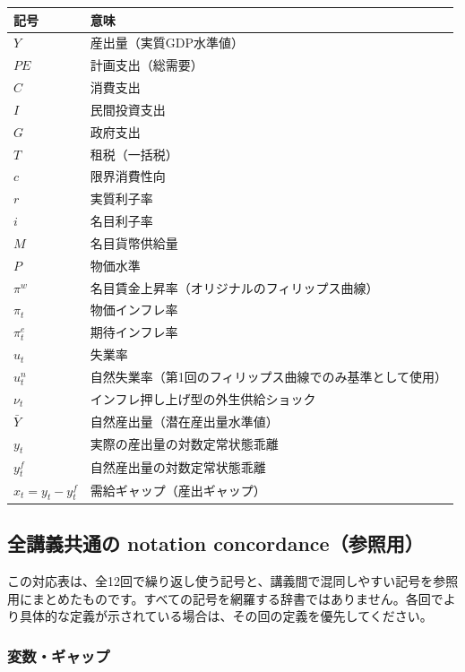 \documentclass[
  japanese,
  lualatex,
  ja=standard,
  12pt,
  a4paper]{ltjsarticle}
\newcounter{none} %
\begin{document}
{\def\LTcaptype{none} %
\begin{longtable}[]{@{}ll@{}}
\toprule\noalign{}
記号 & 意味 \\
\midrule\noalign{}
\endhead
\bottomrule\noalign{}
\endlastfoot
\(Y\) & 産出量（実質GDP水準値） \\
\(PE\) & 計画支出（総需要） \\
\(C\) & 消費支出 \\
\(I\) & 民間投資支出 \\
\(G\) & 政府支出 \\
\(T\) & 租税（一括税） \\
\(c\) & 限界消費性向 \\
\(r\) & 実質利子率 \\
\(i\) & 名目利子率 \\
\(M\) & 名目貨幣供給量 \\
\(P\) & 物価水準 \\
\(\pi^w\) & 名目賃金上昇率（オリジナルのフィリップス曲線） \\
\(\pi_t\) & 物価インフレ率 \\
\(\pi_t^e\) & 期待インフレ率 \\
\(u_t\) & 失業率 \\
\(u_t^n\) & 自然失業率（第1回のフィリップス曲線でのみ基準として使用） \\
\(\nu_t\) & インフレ押し上げ型の外生供給ショック \\
\(\bar{Y}\) & 自然産出量（潜在産出量水準値） \\
\(y_t\) & 実際の産出量の対数定常状態乖離 \\
\(y_t^f\) & 自然産出量の対数定常状態乖離 \\
\(x_t=y_t-y_t^f\) & 需給ギャップ（産出ギャップ） \\
\end{longtable}
}

\clearpage

\subsection{全講義共通の notation
concordance（参照用）}\label{ux5168ux8b1bux7fa9ux5171ux901aux306e-notation-concordanceux53c2ux7167ux7528}

この対応表は、全12回で繰り返し使う記号と、講義間で混同しやすい記号を参照用にまとめたものです。すべての記号を網羅する辞書ではありません。各回でより具体的な定義が示されている場合は、その回の定義を優先してください。

\subsubsection{変数・ギャップ}\label{ux5909ux6570ux30aeux30e3ux30c3ux30d7}
\end{document}
